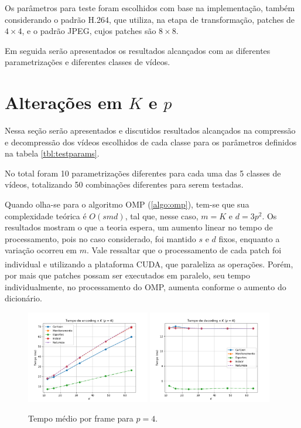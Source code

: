 \documentclass[cic,tc]{iiufrgs}
\newcommand{\reg}{\textsuperscript{\textregistered}}
\begin{document}
Os parâmetros para teste foram escolhidos com base na implementação, também considerando 
o padrão H.264, que utiliza, na etapa de transformação, patches de $4\times4$, 
e o padrão JPEG, cujos patches são $8\times8$.

Em seguida serão apresentados os resultados alcançados com as diferentes parametrizações 
e diferentes classes de vídeos.

\section{Alterações em $K$ e $p$}
Nessa seção serão apresentados e discutidos resultados alcançados na compressão e 
decompressão dos vídeos escolhidos de cada classe para os parâmetros definidos na 
tabela \autoref{tbl:testparams}.

No total foram 10 parametrizações diferentes para cada uma das 5 classes de vídeos, 
totalizando 50 combinações diferentes para serem testadas.

Quando olha-se para o algoritmo OMP (\autoref{algo:omp}), tem-se que sua complexidade teórica 
é $O(s m d)$, tal que, nesse caso, $m = K$ e $d = 3p^2$.
Os resultados mostram o que a teoria espera, um aumento linear no tempo de processamento,
pois no caso considerado, foi mantido $s$ e $d$ fixos, enquanto a variação ocorreu em $m$.
Vale ressaltar que o processamento de cada patch foi individual e utilizando a plataforma 
CUDA\reg, que paraleliza as operações.
Porém, por mais que patches possam ser executados em paralelo, seu tempo individualmente, 
no processamento do OMP, aumenta conforme o aumento do dicionário.

\begin{figure}[h]
    \caption{Tempo médio por frame para $p=4$.}
    \begin{center}
        \includegraphics[width=0.48\textwidth]{img/graficos/p4_ds_etime.png}
        \includegraphics[width=0.48\textwidth]{img/graficos/p4_ds_dtime.png}
    \end{center}
    \label{fig:timep4}
\end{figure}
\end{document}
